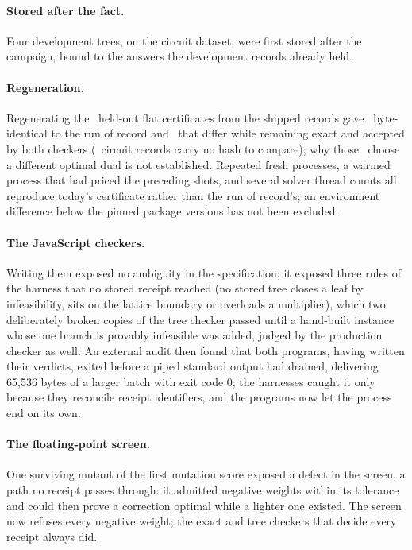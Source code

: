 \documentclass[aps,pra,twocolumn,superscriptaddress,nofootinbib,longbibliography,floatfix]{revtex4-2}
\begin{document}
\paragraph*{Stored after the fact.} Four development trees, on the circuit dataset, were first stored after the campaign, bound to the answers the development records already held.

\paragraph*{Regeneration.} Regenerating the \HoFlat\ held-out flat certificates from the shipped records gave \HoFlatByteIdentical\ byte-identical to the run of record and \HoFlatDifferentValid\ that differ while remaining exact and accepted by both checkers (\HoFlatNoHash\ circuit records carry no hash to compare); why those \HoFlatDifferentValid\ choose a different optimal dual is not established. Repeated fresh processes, a warmed process that had priced the preceding shots, and several solver thread counts all reproduce today's certificate rather than the run of record's; an environment difference below the pinned package versions has not been excluded.

\paragraph*{The JavaScript checkers.} Writing them exposed no ambiguity in the specification; it exposed three rules of the harness that no stored receipt reached (no stored tree closes a leaf by infeasibility, sits on the lattice boundary or overloads a multiplier), which two deliberately broken copies of the tree checker passed until a hand-built instance whose one branch is provably infeasible was added, judged by the production checker as well. An external audit then found that both programs, having written their verdicts, exited before a piped standard output had drained, delivering 65{,}536 bytes of a larger batch with exit code 0; the harnesses caught it only because they reconcile receipt identifiers, and the programs now let the process end on its own.

\paragraph*{The floating-point screen.} One surviving mutant of the first mutation score exposed a defect in the screen, a path no receipt passes through: it admitted negative weights within its tolerance and could then prove a correction optimal while a lighter one existed. The screen now refuses every negative weight; the exact and tree checkers that decide every receipt always did.
\end{document}
